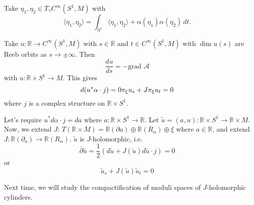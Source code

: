 Take $\eta_1, \eta_2 \in T_\gamma C^\infty(S^1,M)$ with
\[
\langle \eta_1, \eta_2 \rangle=\int_{S^1} \langle \eta_1, \eta_2 \rangle + \alpha(\eta_1)\alpha(\eta_2)\,dt.
\]

Take $u: \mathbb{R}\to C^\infty(S^1, M)$ with $s\in \mathbb{R}$ and $t\in C^\infty(S^1, M)$ with $\dim u(s)$ are Reeb orbits as $s\to \pm \infty$. Then
\[
\dfrac{du}{ds}=-\text{grad }\mathcal{A}
\]
with $u: \mathbb{R}\times S^1 \to M$. This gives
\[
d(u^*\alpha \cdot j)=0 \\
\pi_\xi u_s + J\pi_\xi u_t =0
\]
where $j$ is a complex structure on $\mathbb{R}\times S^1$.

Let's require $u^*d\alpha \cdot j = da$ where $a: \mathbb{R}\times S^1 \to \mathbb{R}$.  Let $\tilde{u}=(a,u):\mathbb{R}\times S^1 \to \mathbb{R}\times M$. Now, we extend $J$: $T(\mathbb{R}\times M)=\mathbb{R}(\partial a) \oplus \mathbb{R}(R_\alpha)\oplus \xi$ where $a\in \mathbb{R}$, and extend $J: \mathbb{R}(\partial_a)\to \mathbb{R}(R_\alpha)$. $\tilde{u}$ is $J$-holomorphic, i.e.
\[
\overline{\partial}\tilde{u}= \dfrac{1}{2} (d\tilde{u}+J(\tilde{u})d\tilde{u}\cdot j)=0
\]
or
\[
\tilde{u}_s+J(\tilde{u})\tilde{u}_t = 0
\]

Next time, we will study the compactification of moduli spaces of $J$-holomorphic cylinders.